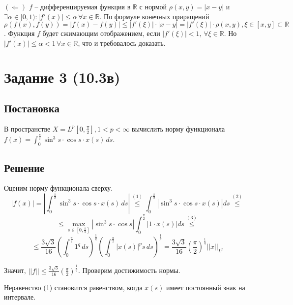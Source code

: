\documentclass[14pt, a4paper, titlepage, fleqn]{extarticle}
\begin{document}
        \( (\Leftarrow) \) \( f \) -- дифференцируемая функция в \( \mathbb{R} \) с нормой \( \rho(x, y) = |x - y| \) и \( \exists  \alpha \in [0, 1): |f'(x)| \leq \alpha \, \forall x \in \mathbb{R}\). По формуле конечных приращений \( \rho\left(f(x), f(y)\right) = |f(x) - f(y)| \leq |f'(\xi)| \cdot |x - y| = |f'(\xi)| \cdot \rho(x, y), \xi \in [x, y]\subset \mathbb{R} \). Функция \( f \) будет сжимающим отображением, если \( |f'(\xi)| < 1, \, \forall \xi \in \mathbb{R} \). Но \( |f'(x)| \leq \alpha < 1  \, \forall x \in \mathbb{R} \), что и требовалось доказать.
    

    \pagebreak

    \section{Задание 3 (10.3в)}

        \subsection{Постановка}
        В пространстве \( X = L^p\left[ 0, \frac{\pi}{2} \right], 1 < p < \infty \) вычислить норму функционала \( f(x)  = \int_0^\frac{\pi}{2} \sin^3 s \cdot \cos s \cdot x(s) \, ds \).
        
        \subsection{Решение}
        Оценим норму функционала сверху.
        \[
            |f(x)| = \left| \int_0^\frac{\pi}{2} \sin^3 s \cdot \cos s \cdot x(s) \, ds \right| \stackrel{(1)}{\leq} 
            \int_0^\frac{\pi}{2} \left| \sin^3 s \cdot \cos s \cdot x(s) \right| ds \stackrel{(2)}{\leq} 
        \]
        \[
            \leq \max_{s\in\left[ 0, \frac{\pi}{2} \right]} \left| \sin^3 s \cdot \cos s \right| \int_0^\frac{\pi}{2} |1 \cdot  x(s)| ds \stackrel{(3)}{\leq}
        \]
        \[
            \leq \frac{3 \sqrt{3}}{16} \left( \int_0^\frac{\pi}{2} 1^q \, ds \right)^{\frac{1}{q}} \left( \int_0^\frac{\pi}{2} |x(s)|^p s \, ds \right)^{\frac{1}{p}} = \frac{3 \sqrt{3}}{16} \left( \frac{\pi}{2} \right)^{\frac{1}{q}} ||x||_{L^p}
        \]

        Значит, \( ||f|| \leq \frac{3 \sqrt{3}}{16} \left( \frac{\pi}{2} \right)^{\frac{1}{q}} \). Проверим достижимость нормы. 
        
        Неравенство (1) становится равенством, когда \( x(s) \) имеет постоянный знак на интервале. 
        
\end{document}
